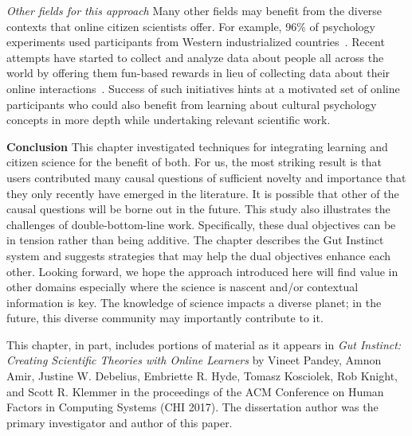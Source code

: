 \textit{Other fields for this approach}
Many other fields may benefit from the diverse contexts that online citizen scientists offer. For example, 96\% of psychology experiments used participants from Western industrialized countries~\cite{Henrich2010a}. Recent attempts have started to collect and analyze data about people all across the world by offering them fun-based rewards in lieu of collecting data about their online interactions~\cite{Reinecke2015}. Success of such initiatives hints at a motivated set of online participants who could also benefit from learning about cultural psychology concepts in more depth while undertaking relevant scientific work. 

\textbf{Conclusion}
This chapter investigated techniques for integrating learning and citizen science for the benefit of both. For us, the most striking result is that users contributed many causal questions of sufficient novelty and importance that they only recently have emerged in the literature. It is possible that other of the causal questions will be borne out in the future. This study also illustrates the challenges of double-bottom-line work. Specifically, these dual objectives can be in tension rather than being additive. The chapter describes the Gut Instinct system and suggests strategies that may help the dual objectives enhance each other. Looking forward, we hope the approach introduced here will find value in other domains especially where the science is nascent and/or contextual information is key. The knowledge of science impacts a diverse planet; in the future, this diverse community may importantly contribute to it.


This chapter, in part, includes portions of material as it appears in \emph{Gut Instinct: Creating Scientific Theories with Online Learners} by Vineet Pandey, Amnon Amir, Justine W. Debelius, Embriette R. Hyde, Tomasz Kosciolek, Rob Knight, and Scott R. Klemmer in the proceedings of the ACM Conference on Human Factors in Computing Systems (CHI 2017). The dissertation author was the primary investigator and author of this paper.
